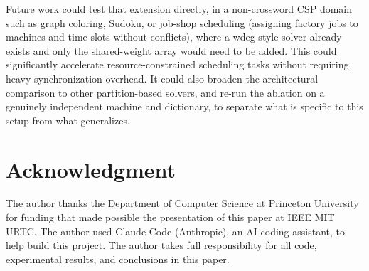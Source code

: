 \documentclass[conference]{IEEEtran}
\begin{document}
Future work could test that extension directly, in a non-crossword CSP domain such as graph coloring, Sudoku, or job-shop scheduling (assigning factory jobs to machines and time slots without conflicts), where a wdeg-style solver already exists and only the shared-weight array would need to be added. This could significantly accelerate resource-constrained scheduling tasks without requiring heavy synchronization overhead. It could also broaden the architectural comparison to other partition-based solvers, and re-run the ablation on a genuinely independent machine and dictionary, to separate what is specific to this setup from what generalizes.

\section*{Acknowledgment}
The author thanks the Department of Computer Science at Princeton University for funding that made possible the presentation of this paper at IEEE MIT URTC. The author used Claude Code (Anthropic), an AI coding assistant, to help build this project. The author takes full responsibility for all code, experimental results, and conclusions in this paper.
\end{document}
